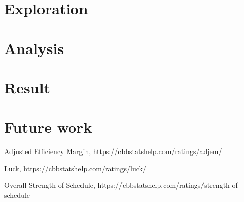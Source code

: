 \documentclass[
10pt, %
a4paper, %
oneside, %
headinclude,footinclude, %
BCOR5mm, %
]{scrartcl}
\begin{document}
\section{Exploration}


\section{Analysis}


\section{Result}


\section{Future work}



\begin{thebibliography}{3}
 Adjusted Efficiency Margin, https://cbbstatshelp.com/ratings/adjem/
 
 Luck, https://cbbstatshelp.com/ratings/luck/
 
 Overall Strength of Schedule, https://cbbstatshelp.com/ratings/strength-of-schedule
\end{thebibliography}

\end{document}
